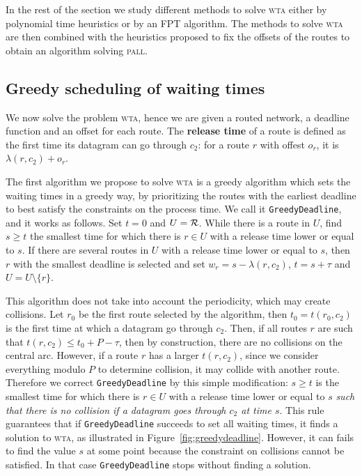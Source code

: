 \documentclass[a4paper,10pt]{article}
\newcommand\greedydeadline{\texttt{GreedyDeadline}\xspace}
\newcommand\pall{\textsc{pall}\xspace}
\newcommand\wta{\textsc{wta}\xspace}
\begin{document}
   In the rest of the section we study different methods to solve \wta either by polynomial time heuristics or by an FPT algorithm. The methods to solve \wta are then combined with the heuristics proposed to fix the offsets of the routes to obtain an algorithm solving \pall.  
   
   \subsection{Greedy scheduling of waiting times}

   We now solve the problem \wta, hence we are given a routed network, a deadline function and an offset for each route. The \textbf{release time} of a route 
   is defined as the first time its datagram can go through $c_2$: for a route $r$ with offest $o_r$, it is $\lambda(r,c_2) + o_r$.

    The first algorithm we propose to solve \wta is a greedy algorithm which sets the waiting times in a greedy way, by prioritizing the routes with the earliest deadline to best satisfy the constraints on the process time. We call it \greedydeadline, and it works as follows. Set $t=0$ and $U = \cal{R}$. While there is a route in $U$, find $s \geq t$ the smallest time for which there is $r \in U$ with a release time lower or equal to $s$. If there are several routes in $U$ with a release time lower or equal  to $s$, then $r$ with the smallest deadline is selected and set $w_r = s - \lambda(r,c_2)$, $t = s + \tau$ and $ U = U \setminus \{r\}$.

    This algorithm does not take into account the periodicity, which may create collisions. Let $r_0$ be the first route selected by the algorithm, then $t_0 = t(r_0,c_2)$ is the first time at which a datagram go through $c_2$.
	Then, if all routes $r$ are such that $t(r, c_2) \leq t_0 + P - \tau$, 
	then by construction, there are no collisions on the central arc.
      However, if a route $r$ has a larger $t(r, c_2)$, since we consider everything modulo $P$ to determine collision, it may collide with another route. Therefore we correct \greedydeadline by this simple modification: $s \geq t$ is the smallest time for which there is $r \in U$ with a release time lower or equal to $s$ \emph{such that there is no collision if a datagram goes through $c_2$ at time $s$}. This rule guarantees that if \greedydeadline succeeds to set all waiting times, it finds a solution to \wta, as illustrated in Figure~\ref{fig:greedydeadline}. However, it can fails to find the value $s$ at some point because the constraint on collisions cannot be satisfied. In that case \greedydeadline stops without finding a solution.
    
\end{document}
